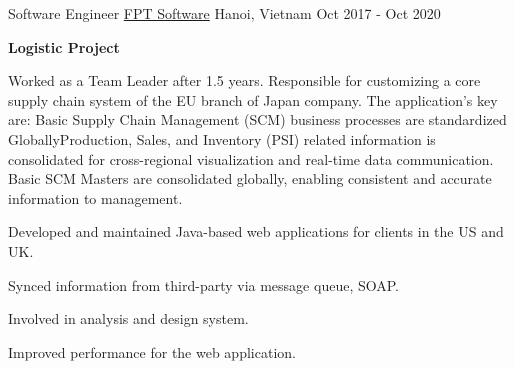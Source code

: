 \begin{cventries}
  \cventry
  {Software Engineer} %
  {\underline{FPT Software}} %
  {Hanoi, Vietnam} %
  {Oct 2017 - Oct 2020} %
  {
  	\begin{cvitems} %
  		\item[ ] {\textbf {Logistic Project}}
  		\item {Worked as a Team Leader after 1.5 years. Responsible for customizing a core supply chain system of the EU branch of Japan company. The application's key are: Basic Supply Chain Management (SCM) business processes are standardized GloballyProduction, Sales, and Inventory (PSI) related information is consolidated for cross-regional visualization and real-time data communication. Basic SCM Masters are consolidated globally, enabling consistent and accurate information to management.}
  		\item {Developed and maintained Java-based web applications for clients in the US and UK.}
		\item {Synced information from third-party via message queue, SOAP.}
  		\item {Involved in analysis and design system.}
  		\item {Improved performance for the web application.}
  	\end{cvitems}
  }

\end{cventries}
